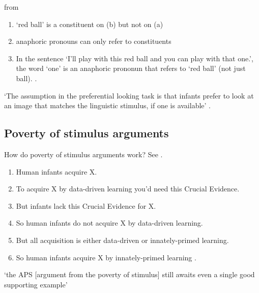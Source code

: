 \documentclass[12pt]{extarticle}
\begin{document}
\begin{multicols}{3}
\begin{center}
\end{center}
 
\begin{center} from \citealp{lidz:2003_what} \end{center}
 
\begin{enumerate}
\item ‘red ball’ is a constituent on (b) but not on (a)
\item anaphoric pronouns can only refer to constituents
\item In the sentence ‘I’ll play with this red ball and you can play with that one.’, the word ‘one’ is an anaphoric prononun that refers to ‘red ball’ (not just ball).
\citep{lidz:2003_what,lidz:2004_reaffirming}.
 
\end{enumerate}
 
‘The assumption in the preferential looking task is that infants prefer to look at an image that matches the linguistic stimulus, if one is available’ \citep{lidz:2003_what}.
 
\subsection{Poverty of stimulus arguments}
 
How do poverty of stimulus arguments work? See \citet{pullum:2002_empirical}.
 
\begin{enumerate}
 
\item
 
Human infants acquire X. 
 
\item
 
To acquire X by data-driven learning you'd need this  Crucial Evidence. 
 
\item
 
But infants lack this Crucial Evidence for X.
 
\item
 
So human infants do not acquire X by data-driven learning.
 
\item
 
But all acquisition is either data-driven or innately-primed learning.
 
\item
 
So human infants acquire X by innately-primed learning .
 
\end{enumerate}
 
‘the APS [argument from the poverty of stimulus] still awaits even a single good supporting example’
\citep[p.\ 47]{pullum:2002_empirical}
     
 
 
 
\footnotesize 


\end{multicols}
\end{document}
